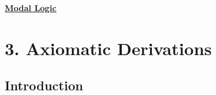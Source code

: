 \documentclass{report}
\begin{document}
\begin{center}
\huge{\textbf{\underline{Modal Logic}}}
\end{center}
 
{\let\clearpage\relax \chapter*{3. Axiomatic Derivations}}
	\section*{Introduction}
		
\end{document}
